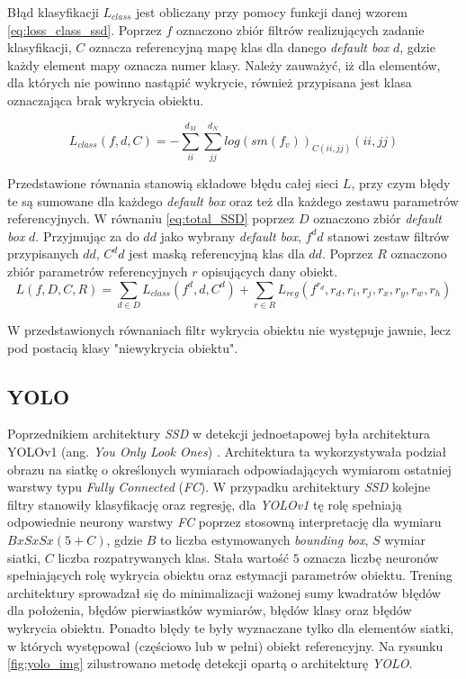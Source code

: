 Błąd klasyfikacji $L_{class}$ jest obliczany przy pomocy funkcji danej wzorem \eqref{eq:loss_class_ssd}. Poprzez $f$ oznaczono zbiór filtrów realizujących zadanie klasyfikacji, $C$ oznacza referencyjną mapę klas dla danego \emph{default box} $d$, gdzie każdy element mapy oznacza numer klasy. Należy zauważyć, iż dla elementów, dla których nie powinno nastąpić wykrycie, również przypisana jest klasa oznaczająca brak wykrycia obiektu.

\begin{equation}
L_{class}(f,d,C) = 
-\sum_{ii}^{d_M}{\sum_{jj}^{d_N}
{log(sm(f_{v}))_{C(ii,jj)}(ii,jj)}
}
\label{eq:loss_class_ssd}
\end{equation}


Przedstawione równania stanowią składowe błędu całej sieci $L$, przy czym błędy te są sumowane dla każdego \emph{default box} oraz też dla każdego zestawu parametrów referencyjnych.
W równaniu \eqref{eq:total_SSD} poprzez $D$ oznaczono zbiór \emph{default box} $d$. 
Przyjmując za do $dd$ jako wybrany \emph{default box},  $f^dd$ stanowi zestaw filtrów przypisanych $dd$, $C^dd$ jest maską referencyjną klas dla $dd$. 
Poprzez $R$ oznaczono zbiór parametrów referencyjnych $r$ opisujących dany obiekt.
\begin{equation}
    L(f, D, C, R) = \sum_{d \in D} {L_{class}(f^d,d,C^d)} + \sum_{r \in R}{L_{reg}(f^{r_d},r_d,r_i,r_j,r_x,r_y,r_w,r_h)}
\label{eq:total_SSD}
\end{equation}

W przedstawionych równaniach filtr wykrycia obiektu nie występuje jawnie, lecz pod postacią klasy "niewykrycia obiektu".


\subsection{YOLO}
\label{ch:yolo}
Poprzednikiem architektury \emph{SSD} w detekcji jednoetapowej była architektura YOLOv1 (ang. \emph{You Only Look Ones}) \cite{yolov1}.
Architektura ta wykorzystywała podział obrazu na siatkę o określonych wymiarach odpowiadających wymiarom ostatniej warstwy typu \emph{Fully Connected} (\emph{FC}).
W przypadku architektury \emph{SSD} kolejne filtry stanowiły klasyfikację oraz regresję, 
dla \emph{YOLOv1} tę rolę spełniają odpowiednie neurony warstwy \emph{FC} poprzez stosowną interpretację dla wymiaru $BxSxSx(5+C)$, gdzie $B$ to liczba estymowanych \emph{bounding box}, $S$ wymiar siatki, $C$ liczba rozpatrywanych klas. 
Stała wartość $5$ oznacza liczbę neuronów spełniających rolę wykrycia obiektu oraz estymacji parametrów obiektu.
Trening architektury sprowadzał się do minimalizacji ważonej sumy kwadratów błędów dla położenia, błędów pierwiastków wymiarów, błędów klasy oraz błędów wykrycia obiektu. 
Ponadto błędy te były wyznaczane tylko dla elementów siatki, w których występował (częściowo lub w pełni) obiekt referencyjny.
Na rysunku \ref{fig:yolo_img} zilustrowano metodę detekcji opartą o architekturę \emph{YOLO}.

